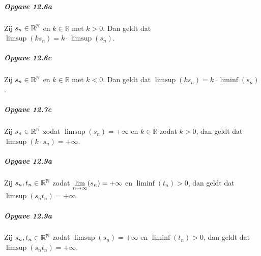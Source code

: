 \subparagraph{Opgave 12.6a} Zij $s_{n}\in\mathbb{R}^{\mathbb{N}}$ en $k\in\mathbb{R}$ met $k>0$. Dan geldt dat $\limsup(ks_{n})=k\cdot\limsup(s_{n})$.

\subparagraph{Opgave 12.6c} Zij $s_{n}\in\mathbb{R}^{\mathbb{N}}$ en $k\in\mathbb{R}$ met $k<0$. Dan geldt dat $\limsup(ks_{n})=k\cdot\liminf(s_{n})$.

\subparagraph{Opgave 12.7c} Zij $s_{n}\in\mathbb{R}^{\mathbb{N}}$ zodat $\limsup(s_{n})=+\infty$ en $k\in\mathbb{R}$ zodat $k>0$, dan geldt dat $\limsup(k \cdot s_{n})=+\infty$.

\subparagraph{Opgave 12.9a} Zij $s_{n},t_{n}\in\mathbb{R}^{\mathbb{N}}$ zodat $\underset{n\to\infty}{\text{lim}}(s_{n})=+\infty$ en $\liminf(t_{n})>0$, dan geldt dat \\$\limsup(s_{n}t_{n})=+\infty$.

\subparagraph{Opgave 12.9a} Zij $s_{n},t_{n}\in\mathbb{R}^{\mathbb{N}}$ zodat $\limsup(s_{n})=+\infty$ en $\liminf(t_{n})>0$, dan geldt dat $\limsup(s_{n}t_{n})=+\infty$.
